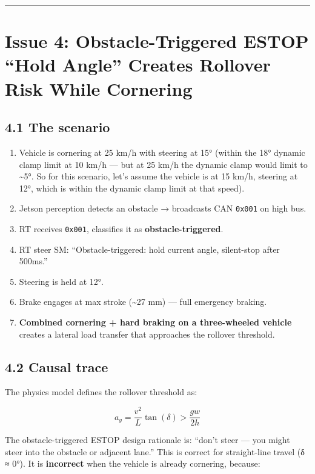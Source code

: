 \documentclass[12pt,a4paper,oneside]{report}
\providecommand{\tightlist}{\setlength{\itemsep}{0pt}\setlength{\parskip}{0pt}}
\begin{document}
\begin{center}\rule{0.5\linewidth}{0.5pt}\end{center}

\section{Issue 4: Obstacle-Triggered ESTOP ``Hold Angle'' Creates Rollover Risk
While
Cornering}\label{issue-4-obstacle-triggered-estop-hold-angle-creates-rollover-risk-while-cornering}

\subsection{4.1 The scenario}\label{the-scenario-2}

\begin{enumerate}
\def\labelenumi{\arabic{enumi}.}
\tightlist
\item
  Vehicle is cornering at 25 km/h with steering at 15° (within the 18° dynamic
  clamp limit at 10 km/h --- but at 25 km/h the dynamic clamp would limit to
  \textasciitilde5°. So for this scenario, let's assume the vehicle is at 15
  km/h, steering at 12°, which is within the dynamic clamp limit at that speed).
\item
  Jetson perception detects an obstacle → broadcasts CAN \texttt{0x001} on high
  bus.
\item
  RT receives \texttt{0x001}, classifies it as \textbf{obstacle-triggered}.
\item
  RT steer SM: ``Obstacle-triggered: hold current angle, silent-stop after
  500ms.''
\item
  Steering is held at 12°.
\item
  Brake engages at max stroke (\textasciitilde27 mm) --- full emergency braking.
\item
  \textbf{Combined cornering + hard braking on a three-wheeled vehicle} creates
  a lateral load transfer that approaches the rollover threshold.
\end{enumerate}

\subsection{4.2 Causal trace}\label{causal-trace-1}

The physics model defines the rollover threshold as:

\[a_y = \frac{v^2}{L}\tan(\delta) > \frac{g w}{2h}\]

The obstacle-triggered ESTOP design rationale is: ``don't steer --- you might
steer into the obstacle or adjacent lane.'' This is correct for straight-line
travel (δ ≈ 0°). It is \textbf{incorrect} when the vehicle is already cornering,
because:
\end{document}
